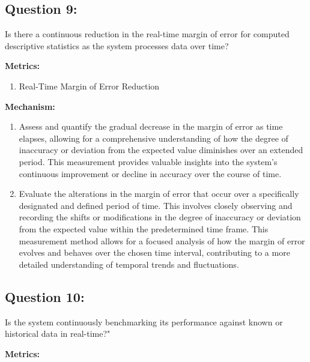 \documentclass[12pt,letterpaper]{report}
\begin{document}
\subsection*{Question 9:} Is there a continuous reduction in the real-time margin of error for computed descriptive statistics as the system processes data over time? 

  

\item \textbf{Metrics:} 

\begin{enumerate} 

        \item Real-Time Margin of Error Reduction  

\end{enumerate}  

\item \textbf{Mechanism:} 

\begin{enumerate} 

        \item Assess and quantify the gradual decrease in the margin of error as time elapses, allowing for a comprehensive understanding of how the degree of inaccuracy or deviation from the expected value diminishes over an extended period. This measurement provides valuable insights into the system's continuous improvement or decline in accuracy over the course of time. 

        \item Evaluate the alterations in the margin of error that occur over a specifically designated and defined period of time. This involves closely observing and recording the shifts or modifications in the degree of inaccuracy or deviation from the expected value within the predetermined time frame. This measurement method allows for a focused analysis of how the margin of error evolves and behaves over the chosen time interval, contributing to a more detailed understanding of temporal trends and fluctuations. 

\end{enumerate} 

\subsection*{Question 10:} Is the system continuously benchmarking its performance against known or historical data in real-time?" 

  

\item \textbf{Metrics:} 
\end{document}
